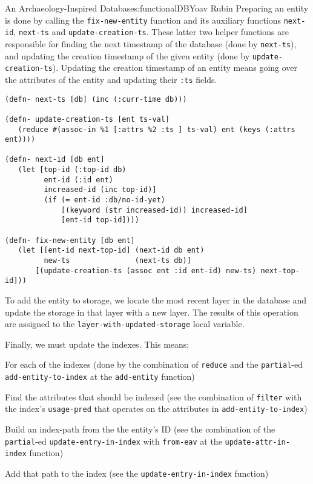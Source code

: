 \begin{aosachapter}{An Archaeology-Inspired Database}{s:functionalDB}{Yoav Rubin}
Preparing an entity is done by calling the \texttt{fix-new-entity}
function and its auxiliary functions \texttt{next-id}, \texttt{next-ts}
and \texttt{update-creation-ts}. These latter two helper functions are
responsible for finding the next timestamp of the database (done by
\texttt{next-ts}), and updating the creation timestamp of the given
entity (done by \texttt{update-creation-ts}). Updating the creation
timestamp of an entity means going over the attributes of the entity and
updating their \texttt{:ts} fields.

\begin{verbatim}
(defn- next-ts [db] (inc (:curr-time db)))

(defn- update-creation-ts [ent ts-val]
   (reduce #(assoc-in %1 [:attrs %2 :ts ] ts-val) ent (keys (:attrs ent))))

(defn- next-id [db ent]
   (let [top-id (:top-id db)
         ent-id (:id ent)
         increased-id (inc top-id)]
         (if (= ent-id :db/no-id-yet)
             [(keyword (str increased-id)) increased-id]
             [ent-id top-id])))

(defn- fix-new-entity [db ent]
   (let [[ent-id next-top-id] (next-id db ent)
         new-ts               (next-ts db)]
       [(update-creation-ts (assoc ent :id ent-id) new-ts) next-top-id]))
\end{verbatim}

To add the entity to storage, we locate the most recent layer in the
database and update the storage in that layer with a new layer. The
results of this operation are assigned to the
\texttt{layer-with-updated-storage} local variable.

Finally, we must update the indexes. This means:

\begin{aosaitemize}

\item
  For each of the indexes (done by the combination of \texttt{reduce}
  and the \texttt{partial}-ed \texttt{add-entity-to-index} at the
  \texttt{add-entity} function)

  \begin{aosaitemize}
  
  \item
    Find the attributes that should be indexed (see the combination of
    \texttt{filter} with the index's \texttt{usage-pred} that operates
    on the attributes in \texttt{add-entity-to-index})
  \item
    Build an index-path from the the entity's ID (see the combination of
    the \texttt{partial}-ed \texttt{update-entry-in-index} with
    \texttt{from-eav} at the \texttt{update-attr-in-index} function)
  \item
    Add that path to the index (see the \texttt{update-entry-in-index}
    function)
  \end{aosaitemize}
\end{aosaitemize}


\end{aosachapter}
